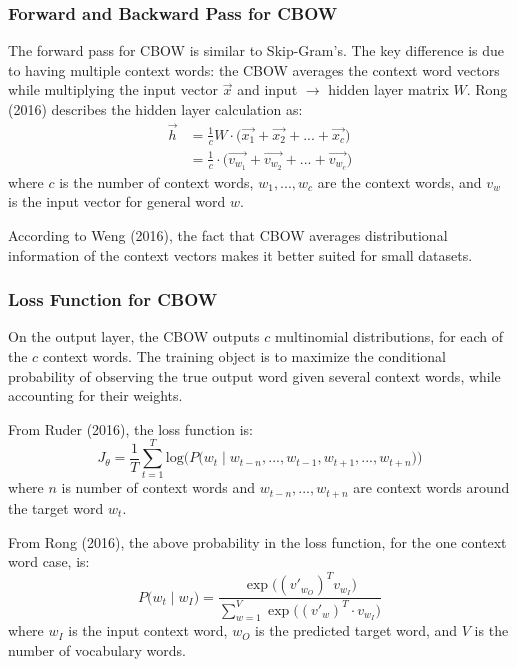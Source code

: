 \subsubsection{Forward and Backward Pass for CBOW}

The forward pass for CBOW is similar to Skip-Gram's. The key difference is due to having multiple context words: the CBOW averages the context word vectors while multiplying the input vector $\overrightarrow{x}$ and input $\rightarrow$ hidden layer matrix $W$. Rong (2016) describes the hidden layer calculation as: 
$$
\begin{array}{ll}
\overrightarrow{h} 
&= \frac{1}{c} W \cdot \Big(\overrightarrow{x_1} + \overrightarrow{x_2} + ... + \overrightarrow{x_c} \Big) \\
&= \frac{1}{c} \cdot \Big(\overrightarrow{v_{w_1}} + \overrightarrow{v_{w_2}} + ... + \overrightarrow{v_{w_c}} \Big)
\end{array}
$$
where $c$ is the number of context words, $w_1,...,w_c$ are the context words, and $v_w$ is the input vector for general word $w$. 

According to Weng (2016), the fact that CBOW averages distributional information of the context vectors makes it better suited for small datasets. 

\subsubsection{Loss Function for CBOW}

On the output layer, the CBOW outputs $c$ multinomial distributions, for each of the $c$ context words. The training object is to maximize the conditional probability of observing the true output word given several context words, while accounting for their weights. 

From Ruder (2016), the loss function is: 
$$
J_\theta = \frac{1}{T} \sum_{t=1}^T \text{log} \Big( P \Big( w_t \; | \; w_{t-n}, ..., w_{t-1}, w_{t+1}, ..., w_{t+n} \Big) \Big)
$$
where $n$ is number of context words and $w_{t-n}, ..., w_{t+n}$ are context words around the target word $w_t$. 

From Rong (2016), the above probability in the loss function, for the one context word case, is:
$$
P \Big( w_t \; | \; w_I \Big) = \frac {\exp{ \Big( (v'_{w_O})^T  v_{w_I} \Big) }} {\sum_{w=1}^V \exp{ \Big( (v'_w)^T \cdot v_{w_I} \Big) }}
$$
where $w_I$ is the input context word, $w_O$ is the predicted target word, and $V$ is the number of vocabulary words. 
\newline 

